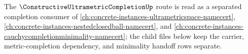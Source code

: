 The $\ConstructiveUltrametricCompletionUp$ route is read as a separated completion consumer of \autoref{ch:concrete-instances-ultrametricspace-namecert}, \autoref{ch:concrete-instances-nestedclosedball-namecert}, and \autoref{ch:concrete-instances-cauchycompletionminimality-namecert}; the child files below keep the carrier, metric-completion dependency, and minimality handoff rows separate.





